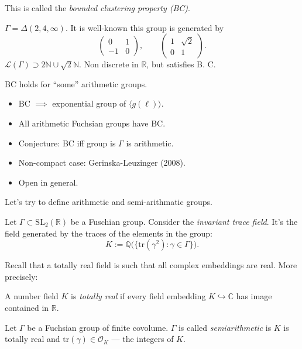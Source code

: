 \noindent
This is called the
{\it bounded clustering property (BC)}.

\begin{example}
\label{example-triangle24oo}
$\Gamma=\Delta(2,4,\infty)$.
It is well-known this group is generated
by
$$
\begin{pmatrix}0&1\\ -1&0\end{pmatrix},
\qquad 
\begin{pmatrix}1&\sqrt{2}\\ 0&1\end{pmatrix}.
$$
$\mathcal{L}(\Gamma) \supset 2 \mathbb{N}
\cup \sqrt{2}\mathbb{N}$.
Non discrete in $\mathbb{R}$,
but satisfies B. C.
\end{example}

\begin{remark}
\label{remark-bc-holds}
BC holds for ``some''
arithmetic groups.
\end{remark}

\begin{itemize}
\item BC $\implies $ exponential group
of $\langle g(\ell)\rangle$.
\item All arithmetic Fuchsian groups have 
BC.
\item Conjecture: BC iff group is $\Gamma$
is arithmetic.
\item Non-compact case: Gerinska-Leuzinger
(2008).
\item Open in general.
\end{itemize}

\medskip\noindent
Let's try to define arithmetic 
and semi-arithmatic groups.

Let $\Gamma \subset \text{SL}_2(\mathbb{R})$
be a Fuschian group.
Consider the {\it invariant trace field}.
It's the field generated by the traces
of the elements in the group:
$$
K:=\mathbb{Q}\bigl(\{\text{tr}(\gamma^2):
\gamma \in \Gamma\}\bigr).
$$

Recall that a totally real field
is such that all complex embeddings are real.
More precisely:

\begin{definition}
\label{definition-totally-real-field}
A number field $K$ is {\it totally real} if 
every field embedding
$K \hookrightarrow \mathbb{C}$ has image 
contained in $\mathbb{R}$.
\end{definition}

\begin{definition}
\label{definition-semiarithmetic}
Let $\Gamma$ be a Fuchsian group
of finite covolume. $\Gamma$ is called
{\it semiarithmetic} is $K$ is totally
real and
$\text{tr}(\gamma) \in \mathcal{O}_K$
--- the integers of $K$.
\end{definition}

